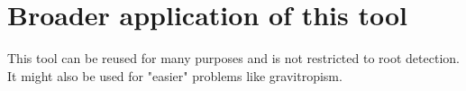 %
%
%
%
%
%
%

\section{Broader application of this tool}

This tool can be reused for many purposes and is not restricted to root detection.
It might also be used for "easier" problems like gravitropism.

